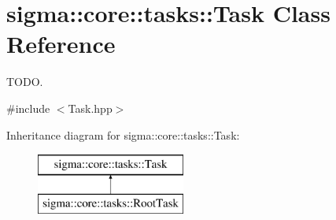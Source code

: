\hypertarget{classsigma_1_1core_1_1tasks_1_1_task}{}\section{sigma\+:\+:core\+:\+:tasks\+:\+:Task Class Reference}
\label{classsigma_1_1core_1_1tasks_1_1_task}


T\+O\+D\+O.  




{\ttfamily \#include $<$Task.\+hpp$>$}

Inheritance diagram for sigma\+:\+:core\+:\+:tasks\+:\+:Task\+:\begin{figure}[H]
\begin{center}
\leavevmode
\includegraphics[height=2.000000cm]{classsigma_1_1core_1_1tasks_1_1_task}
\end{center}
\end{figure}
